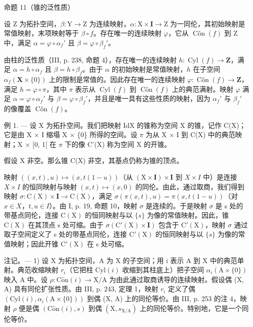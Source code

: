 命题 11（锥的泛性质）

设 Z 为拓扑空间，\(\beta: \mathrm{Y} \to \mathrm{Z}\) 为连续映射，\(\alpha: \mathrm{X} \times \mathbf{I} \to \mathrm{Z}\) 为一同伦，其初始映射是常值映射，末项映射等于 \(\beta \circ f\)。存在唯一的连续映射 \(\varphi\)，它从 \(\operatorname{Côn}(f)\) 到 Z 中，满足 \(\alpha = \varphi \circ \alpha_f'\) 且 \(\beta = \varphi \circ \beta_f'\)。

由柱的泛性质（III, p. 238, 命题 4），存在唯一的连续映射 \(h \colon \operatorname{Cyl}(f) \to \mathbf{Z}\)，满足 \(\alpha = h \circ \alpha_f\) 且 \(\beta = h \circ \beta_f\)。由于 \(\alpha\) 的初始映射是常值映射，\(h\) 在子空间 \(\alpha_f(\mathbf{X} \times \{0\})\) 上的限制是常值的。因此存在唯一的连续映射 \(\varphi \colon \operatorname{Côn}(f) \to \mathbf{Z}\)，满足 \(h = \varphi \circ \pi\)，其中 \(\pi\) 表示从 \(\operatorname{Cyl}(f)\) 到 \(\operatorname{Côn}(f)\) 上的典范满射。映射 \(\varphi\) 满足 \(\alpha = \varphi \circ \alpha_f'\) 与 \(\beta = \varphi \circ \beta_f'\)，并且是唯一具有这些性质的映射，因为 \(\alpha_f'\) 与 \(\beta_f'\) 的像覆盖 \(\operatorname{Côn}(f)\)。

例 1. --- 设 X 为拓扑空间。我们把映射 IdX 的锥称为空间 X 的锥，记作 C(X)；它是由 X × I 缩塌 X × \{0\} 所得的空间。设 \(\pi\) 为从 X × I 到 C(X) 中的典范映射；X × {[}0, 1{[} 在 \(\pi\) 下的像 C'(X) 称为空间 X 的开锥。

假设 X 非空。那么锥 C(X) 非空，其基点仍称为锥的顶点。

映射 \(((x,t),u)\mapsto(x,t(1-u))\)（从 \((\mathrm{X}\times\mathbf{I})\times\mathbf{I}\) 到 \(X\times I\) 中）是连接 \(X\times I\) 的恒同映射与映射 \((x,t)\mapsto(x,0)\) 的同伦。由此，通过取商，我们得到映射 \(\sigma\colon\mathrm{C}(\mathrm{X})\times\mathbf{I}\to\mathrm{C}(\mathrm{X})\)，满足 \(\sigma(\pi(x,t),u)=\pi(x,t(1-u))\)（对 \(x\in X\)，\(t,u\in I\)）。由 I, p. 19, 命题 10，映射 \(\sigma\) 是连续的。于是映射 \(\sigma\) 是 s 处的带基点同伦，连接 \(\mathrm{C}(\mathrm{X})\) 的恒同映射与以 \(\{s\}\) 为像的常值映射。因此，锥 \(\mathrm{C}(\mathrm{X})\) 在其顶点 s 处可缩。由于 \(\sigma(\mathrm{C}'(\mathrm{X})\times\mathbf{I})\) 包含于 \(\mathrm{C}'(\mathrm{X})\)，映射 \(\sigma\) 通过取子空间定义了 s 处的带基点同伦，连接 \(\mathrm{C}'(\mathrm{X})\) 的恒同映射与以 \(\{s\}\) 为像的常值映射；因此开锥 \(\mathrm{C}'(\mathrm{X})\) 在 s 处可缩。

注记。--- 1) 设 X 为拓扑空间，A 为 X 的子空间；用 i 表示 A 到 X 中的典范单射。典范收缩映射 \(r_{i}\)（它把柱 \(\mathrm{Cyl}(i)\) 收缩到其柱底上）把子空间 \(\alpha_{i}(\mathrm{A} \times \{0\})\) 映入 A 中。设 \(\rho: \mathrm{C}\hat{\mathrm{o}}\mathrm{n}(i) \to \mathrm{X}/\mathrm{A}\) 为由此通过取商诱导的连续映射。假设偶 (X, A) 具有同伦扩张性质。由 III, p. 243, 定理 1，映射 \(r_{i}\) 定义了偶 \((\mathrm{Cyl}(i), \alpha_{i}(\mathrm{A} \times \{0\}))\) 到偶 (X, A) 上的同伦等价。由 III, p. 253 的注 4，映射 \(\rho\) 便是偶 \((\mathrm{C}\hat{\mathrm{o}}\mathrm{n}(i), s)\) 到偶 \((\mathrm{X}, s_{\mathrm{X}/\mathrm{A}})\) 上的同伦等价。特别地，它是一个同伦等价。

